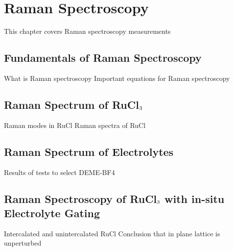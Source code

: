\chapter{Raman Spectroscopy}
This chapter covers Raman spectroscopy measurements

\section{Fundamentals of Raman Spectroscopy}
What is Raman spectroscopy
Important equations for Raman spectroscopy

\section{Raman Spectrum of RuCl$\textsubscript{3}$}
Raman modes in RuCl
Raman spectra of RuCl

\section{Raman Spectrum of Electrolytes}
Results of tests to select DEME-BF4

\section{Raman Spectroscopy of RuCl$\textsubscript{3}$ with in-situ Electrolyte Gating}
Intercalated and unintercalated RuCl
Conclusion that in plane lattice is unperturbed